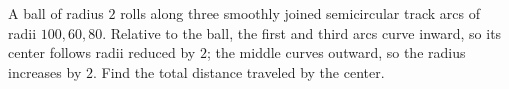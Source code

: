 A ball of radius $2$ rolls along three smoothly joined semicircular track arcs of radii $100,60,80$. Relative to the ball, the first and third arcs curve inward, so its center follows radii reduced by $2$; the middle curves outward, so the radius increases by $2$. Find the total distance traveled by the center.
